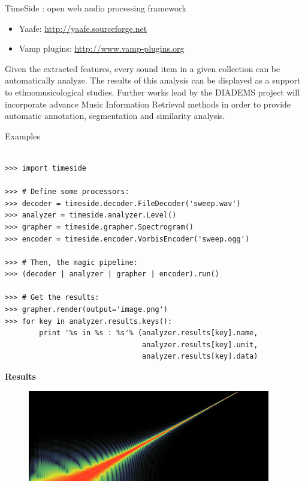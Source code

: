 \documentclass[final, hyperref, table]{beamer}
\begin{document}
\begin{frame}[containsverbatim]{}
\begin{columns}[t]
\begin{column}[T]{.49\linewidth}
\begin{block}{TimeSide : open web audio processing framework}
\begin{itemize}
  \item Yaafe: \url{http://yaafe.sourceforge.net} \cite{yaafe_ISMIR2010}
  \item Vamp plugins: \url{http://www.vamp-plugins.org} \cite{vamp-plugins}
    \end{itemize}


Given the extracted features, every sound item in a given collection can be automatically analyze. The results of this analysis can be displayed as a support to ethnomusicological studies.
Further works lead by the DIADEMS project will incorporate advance Music Information Retrieval methods in order to provide automatic annotation, segmentation and similarity analysis.
  \end{block}
  \begin{block}{Examples}
    \begin{minipage}{0.62\linewidth}
      \begin{lstlisting}

>>> import timeside

>>> # Define some processors:
>>> decoder = timeside.decoder.FileDecoder('sweep.wav')
>>> analyzer = timeside.analyzer.Level()
>>> grapher = timeside.grapher.Spectrogram()
>>> encoder = timeside.encoder.VorbisEncoder('sweep.ogg')

>>> # Then, the magic pipeline:
>>> (decoder | analyzer | grapher | encoder).run()

>>> # Get the results:
>>> grapher.render(output='image.png')
>>> for key in analyzer.results.keys():
        print '%s in %s : %s'% (analyzer.results[key].name,
                                analyzer.results[key].unit,
                                analyzer.results[key].data)
\end{lstlisting}
\end{minipage}
\begin{minipage}{0.32\linewidth}
  \begin{center}
    \textbf{Results}
    \begin{figure}
      \centering
      \includegraphics{img/spectrogram.png}
    \end{figure}
 \end{center} 
\begin{lstlisting}


\end{lstlisting}
\end{minipage}
\end{block}
\end{column}
\end{columns}
\end{frame}
\end{document}
